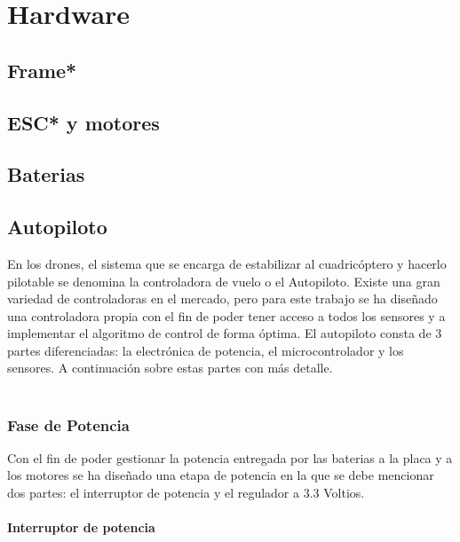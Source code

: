\chapter{Hardware}

\section{Frame*}
\section{ESC* y motores}
\section{Baterias}

\section{Autopiloto}

En los drones, el sistema que se encarga de estabilizar al cuadricóptero y hacerlo pilotable se denomina la controladora de vuelo o el Autopiloto. Existe una gran variedad de controladoras en el mercado, pero para este trabajo se ha diseñado una controladora propia con el fin de poder tener acceso a todos los sensores y a implementar el algoritmo de control de forma óptima. El autopiloto consta de 3 partes diferenciadas: la electrónica de potencia, el microcontrolador y los sensores. A continuación  sobre estas partes con más detalle.\\


\\


\subsection{Fase de Potencia}

Con el fin de poder gestionar la potencia entregada por las baterias a la placa y a los motores se ha diseñado una etapa de potencia en la que se debe mencionar dos partes: el interruptor de potencia y el regulador a 3.3 Voltios.

\subsubsection{Interruptor de potencia}


